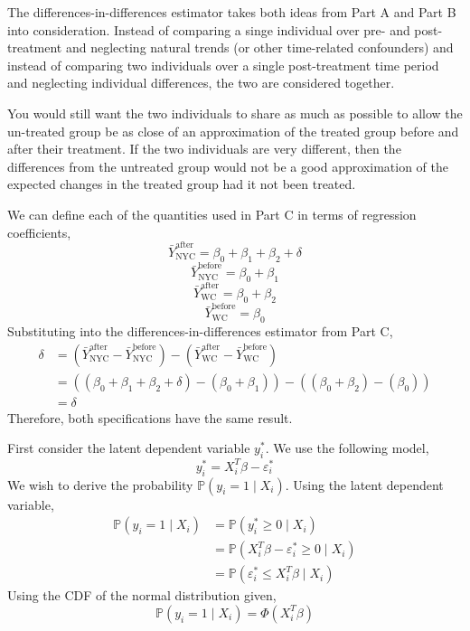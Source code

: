 \documentclass[12pt,twoside]{article}
\begin{document}
\begin{problems}
\begin{problemparts}
\problempart %

The differences-in-differences estimator takes both ideas from Part A and
Part B into consideration. Instead of comparing a singe individual over pre-
and post-treatment and neglecting natural trends (or other time-related
confounders) and instead of comparing two individuals over a single
post-treatment time period and neglecting individual differences, the two are
considered together.

\problempart %

You would still want the two individuals to share as much as possible to
allow the un-treated group be as close of an approximation of the treated
group before and after their treatment. If the two individuals are very
different, then the differences from the untreated group would not be a good
approximation of the expected changes in the treated group had it not been
treated.

\problempart %

We can define each of the quantities used in Part C in terms of regression
coefficients,
$$ \bar{Y}_{\mathrm{NYC}}^{\mathrm{after}} = \beta_0 + \beta_1 + \beta_2 +
\delta $$
$$ \bar{Y}_{\mathrm{NYC}}^{\mathrm{before}} = \beta_0 + \beta_1 $$
$$ \bar{Y}_{\mathrm{WC}}^{\mathrm{after}} = \beta_0 + \beta_2 $$
$$ \bar{Y}_{\mathrm{WC}}^{\mathrm{before}} = \beta_0 $$
Substituting into the differences-in-differences estimator from Part C,
\begin{align*}
    \delta &= \left(\bar{Y}_{\mathrm{NYC}}^{\mathrm{after}}
    -\bar{Y}_{\mathrm{NYC}}^{\mathrm{before}}\right) -
    \left(\bar{Y}_{\mathrm{WC}}^{\mathrm{after}} -
    \bar{Y}_{\mathrm{WC}}^{\mathrm{before}}\right) \\
    &= ((\beta_0 + \beta_1 + \beta_2 + \delta) - (\beta_0 + \beta_1)) -
    ((\beta_0 + \beta_2) - (\beta_0)) \\
    &= \delta
\end{align*}
Therefore, both specifications have the same result.

\end{problemparts}

\newpage

\problem  %

\begin{problemparts}

\problempart %

First consider the latent dependent variable $y_i^*$. We use the following
model,
$$ y_i^* = X_i^T \beta - \varepsilon_i^* $$
We wish to derive the probability $\mathbb{P}(y_i = 1 \mid X_i)$. Using the
latent dependent variable,
\begin{align*}
    \mathbb{P}(y_i = 1 \mid X_i) &= \mathbb{P}(y_i^* \geq 0 \mid X_i) \\
    &= \mathbb{P}(X_i^T \beta - \varepsilon_i^* \geq 0 \mid X_i) \\
    &= \mathbb{P}(\varepsilon_i^* \leq X_i^T \beta \mid X_i)
\end{align*}
Using the CDF of the normal distribution given,
$$ \mathbb{P}(y_i = 1 \mid X_i) = \boxed{\Phi(X_i^T \beta)} $$


\end{problemparts}
\end{problems}
\end{document}
